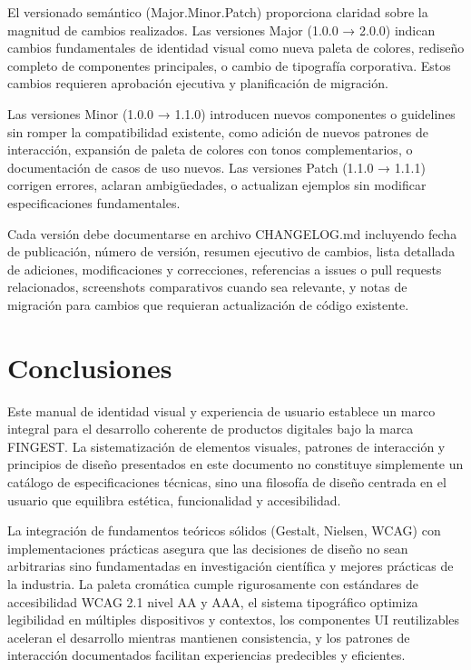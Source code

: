 \documentclass[12pt,a4paper,oneside]{article}
\begin{document}
El versionado semántico (Major.Minor.Patch) proporciona claridad sobre la magnitud de cambios realizados. Las versiones Major (1.0.0 → 2.0.0) indican cambios fundamentales de identidad visual como nueva paleta de colores, rediseño completo de componentes principales, o cambio de tipografía corporativa. Estos cambios requieren aprobación ejecutiva y planificación de migración.

Las versiones Minor (1.0.0 → 1.1.0) introducen nuevos componentes o guidelines sin romper la compatibilidad existente, como adición de nuevos patrones de interacción, expansión de paleta de colores con tonos complementarios, o documentación de casos de uso nuevos. Las versiones Patch (1.1.0 → 1.1.1) corrigen errores, aclaran ambigüedades, o actualizan ejemplos sin modificar especificaciones fundamentales.

Cada versión debe documentarse en archivo CHANGELOG.md incluyendo fecha de publicación, número de versión, resumen ejecutivo de cambios, lista detallada de adiciones, modificaciones y correcciones, referencias a issues o pull requests relacionados, screenshots comparativos cuando sea relevante, y notas de migración para cambios que requieran actualización de código existente.

\section{Conclusiones}

Este manual de identidad visual y experiencia de usuario establece un marco integral para el desarrollo coherente de productos digitales bajo la marca FINGEST. La sistematización de elementos visuales, patrones de interacción y principios de diseño presentados en este documento no constituye simplemente un catálogo de especificaciones técnicas, sino una filosofía de diseño centrada en el usuario que equilibra estética, funcionalidad y accesibilidad.

La integración de fundamentos teóricos sólidos (Gestalt, Nielsen, WCAG) con implementaciones prácticas asegura que las decisiones de diseño no sean arbitrarias sino fundamentadas en investigación científica y mejores prácticas de la industria. La paleta cromática cumple rigurosamente con estándares de accesibilidad WCAG 2.1 nivel AA y AAA, el sistema tipográfico optimiza legibilidad en múltiples dispositivos y contextos, los componentes UI reutilizables aceleran el desarrollo mientras mantienen consistencia, y los patrones de interacción documentados facilitan experiencias predecibles y eficientes.
\end{document}

